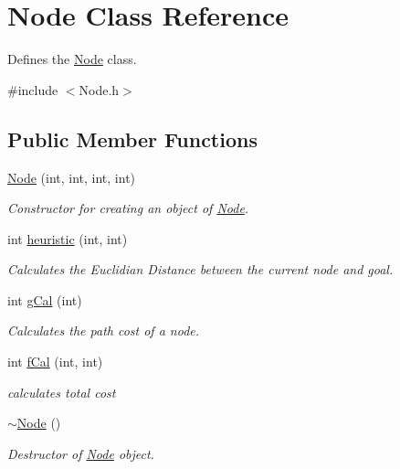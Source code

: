 \hypertarget{classNode}{}\section{Node Class Reference}
\label{classNode}


Defines the \hyperlink{classNode}{Node} class.  




{\ttfamily \#include $<$Node.\+h$>$}

\subsection*{Public Member Functions}
\begin{DoxyCompactItemize}
\item 
\hyperlink{classNode_ae024f3b6f5de061d2c4217694191a588}{Node} (int, int, int, int)
\begin{DoxyCompactList}\small\item\em Constructor for creating an object of \hyperlink{classNode}{Node}. \end{DoxyCompactList}\item 
int \hyperlink{classNode_aab7e2a290b16052153e68f2c45957cab}{heuristic} (int, int)
\begin{DoxyCompactList}\small\item\em Calculates the Euclidian Distance between the current node and goal. \end{DoxyCompactList}\item 
int \hyperlink{classNode_abbad479d38bd75d58161d20ccf2dda40}{g\+Cal} (int)
\begin{DoxyCompactList}\small\item\em Calculates the path cost of a node. \end{DoxyCompactList}\item 
int \hyperlink{classNode_a7408eba08654dabf91908cf129ed2864}{f\+Cal} (int, int)
\begin{DoxyCompactList}\small\item\em calculates total cost \end{DoxyCompactList}\item 
\hyperlink{classNode_aa0840c3cb5c7159be6d992adecd2097c}{$\sim$\+Node} ()\hypertarget{classNode_aa0840c3cb5c7159be6d992adecd2097c}{}\label{classNode_aa0840c3cb5c7159be6d992adecd2097c}

\begin{DoxyCompactList}\small\item\em Destructor of \hyperlink{classNode}{Node} object. \end{DoxyCompactList}\end{DoxyCompactItemize}
